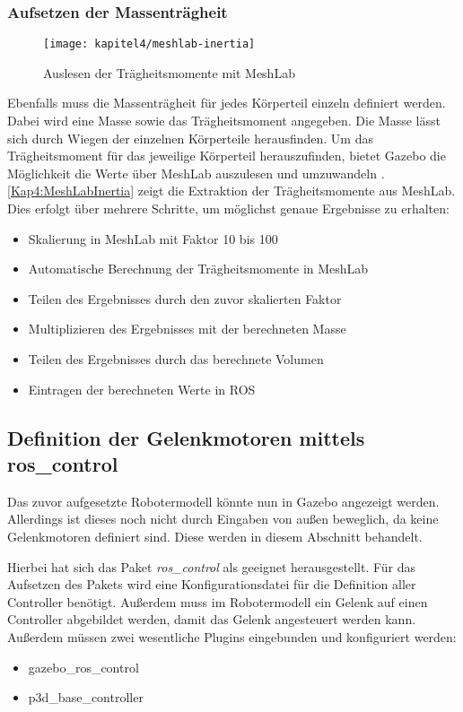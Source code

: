 \subsubsection{Aufsetzen der Massenträgheit}

\begin{figure}[b!]
  \centering
  \texttt{[image: kapitel4/meshlab-inertia]}
  \caption{Auslesen der Trägheitsmomente mit MeshLab}
  \label{Kap4:MeshLabInertia}
\end{figure}

Ebenfalls muss die Massenträgheit für jedes Körperteil einzeln definiert werden. Dabei wird eine Masse sowie das Trägheitsmoment angegeben. Die Masse lässt sich durch Wiegen der einzelnen Körperteile herausfinden. Um das Trägheitsmoment für das jeweilige Körperteil herauszufinden, bietet Gazebo die Möglichkeit die Werte über MeshLab auszulesen und umzuwandeln \autocite{gazebo-inertial}. \autoref{Kap4:MeshLabInertia} zeigt die Extraktion der Trägheitsmomente aus MeshLab. Dies erfolgt über mehrere Schritte, um möglichst genaue Ergebnisse zu erhalten:
\begin{itemize}
  \item Skalierung in MeshLab mit Faktor 10 bis 100
  \item Automatische Berechnung der Trägheitsmomente in MeshLab
  \item Teilen des Ergebnisses durch den zuvor skalierten Faktor
  \item Multiplizieren des Ergebnisses mit der berechneten Masse
  \item Teilen des Ergebnisses durch das berechnete Volumen
  \item Eintragen der berechneten Werte in \ac{ROS}
\end{itemize}

\subsection{Definition der Gelenkmotoren mittels ros\_control}

Das zuvor aufgesetzte Robotermodell könnte nun in Gazebo angezeigt werden. Allerdings ist dieses noch nicht durch Eingaben von außen beweglich, da keine Gelenkmotoren definiert sind. Diese werden in diesem Abschnitt behandelt.

Hierbei hat sich das Paket \textit{ros\_control} als geeignet herausgestellt. Für das Aufsetzen des Pakets wird eine Konfigurationsdatei für die Definition aller Controller benötigt. Außerdem muss im Robotermodell ein Gelenk auf einen Controller abgebildet werden, damit das Gelenk angesteuert werden kann. Außerdem müssen zwei wesentliche Plugins eingebunden und konfiguriert werden:
\begin{itemize}
  \item gazebo\_ros\_control
  \item p3d\_base\_controller
\end{itemize}

